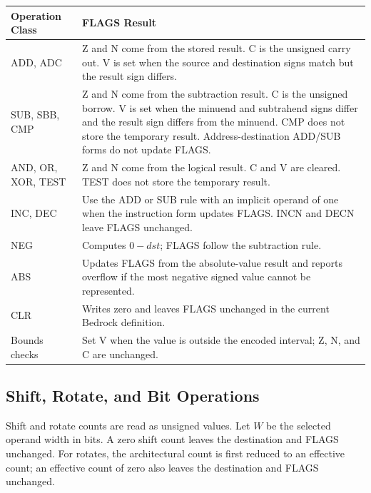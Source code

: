 \begingroup\footnotesize
\begin{longtable}{@{}p{1.15in}p{4.25in}@{}}
\toprule
\textbf{Operation Class} & \textbf{FLAGS Result}\\
\midrule
\endhead
ADD, ADC & Z and N come from the stored result. C is the unsigned carry out. V is set when the source and destination signs match but the result sign differs.\\
SUB, SBB, CMP & Z and N come from the subtraction result. C is the unsigned borrow. V is set when the minuend and subtrahend signs differ and the result sign differs from the minuend. CMP does not store the temporary result. Address-destination ADD/SUB forms do not update FLAGS.\\
AND, OR, XOR, TEST & Z and N come from the logical result. C and V are cleared. TEST does not store the temporary result.\\
INC, DEC & Use the ADD or SUB rule with an implicit operand of one when the instruction form updates FLAGS. INCN and DECN leave FLAGS unchanged.\\
NEG & Computes \(0 - dst\); FLAGS follow the subtraction rule.\\
ABS & Updates FLAGS from the absolute-value result and reports overflow if the most negative signed value cannot be represented.\\
CLR & Writes zero and leaves FLAGS unchanged in the current Bedrock definition.\\
Bounds checks & Set V when the value is outside the encoded interval; Z, N, and C are unchanged.\\
\bottomrule
\end{longtable}
\endgroup

\subsection{Shift, Rotate, and Bit Operations}
Shift and rotate counts are read as unsigned values. Let \(W\) be the selected operand width
in bits. A zero shift count leaves the destination and FLAGS unchanged. For rotates, the
architectural count is first reduced to an effective count; an effective count of zero also
leaves the destination and FLAGS unchanged.

